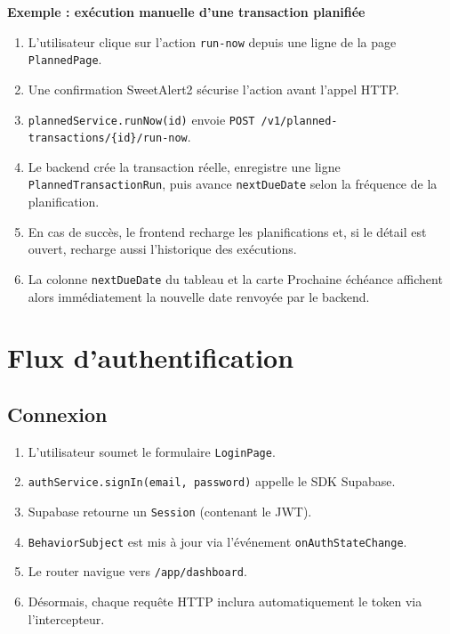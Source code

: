 \documentclass[12pt,a4paper]{article}
\begin{document}
\begin{mdframed}[style=infobox]
\textbf{Exemple : exécution manuelle d'une transaction planifiée}
\end{mdframed}

\begin{enumerate}
  \item L'utilisateur clique sur l'action \texttt{run-now} depuis une ligne de la
        page \texttt{PlannedPage}.
  \item Une confirmation SweetAlert2 sécurise l'action avant l'appel HTTP.
  \item \texttt{plannedService.runNow(id)} envoie
        \texttt{POST /v1/planned-transactions/\{id\}/}\allowbreak\texttt{run-now}.
  \item Le backend crée la transaction réelle, enregistre une ligne
        \texttt{PlannedTransactionRun}, puis avance \texttt{nextDueDate} selon
        la fréquence de la planification.
  \item En cas de succès, le frontend recharge les planifications et, si le détail
        est ouvert, recharge aussi l'historique des exécutions.
  \item La colonne \texttt{nextDueDate} du tableau et la carte \og Prochaine
        échéance \fg{} affichent alors immédiatement la nouvelle date renvoyée
        par le backend.
\end{enumerate}

\section{Flux d'authentification}

\subsection{Connexion}

\begin{enumerate}
  \item L'utilisateur soumet le formulaire \texttt{LoginPage}.
  \item \texttt{authService.signIn(email, password)} appelle le SDK Supabase.
  \item Supabase retourne un \texttt{Session} (contenant le JWT).
  \item \texttt{BehaviorSubject} est mis à jour via l'événement \texttt{onAuthStateChange}.
  \item Le router navigue vers \texttt{/app/dashboard}.
  \item Désormais, chaque requête HTTP inclura automatiquement le token via l'intercepteur.
\end{enumerate}
\end{document}
